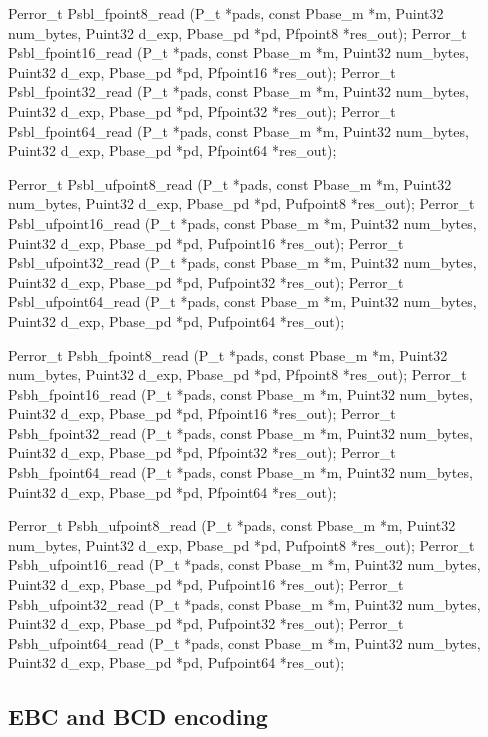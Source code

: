 \begin{tinycodeaux}{\leftmargin=0in}
\codeallowbreaks
Perror_t Psbl_fpoint8_read    (P_t *pads, const Pbase_m *m, Puint32 num_bytes, Puint32 d_exp,
			       Pbase_pd *pd, Pfpoint8 *res_out);
Perror_t Psbl_fpoint16_read   (P_t *pads, const Pbase_m *m, Puint32 num_bytes, Puint32 d_exp,
			       Pbase_pd *pd, Pfpoint16 *res_out);
Perror_t Psbl_fpoint32_read   (P_t *pads, const Pbase_m *m, Puint32 num_bytes, Puint32 d_exp,
			       Pbase_pd *pd, Pfpoint32 *res_out);
Perror_t Psbl_fpoint64_read   (P_t *pads, const Pbase_m *m, Puint32 num_bytes, Puint32 d_exp,
			       Pbase_pd *pd, Pfpoint64 *res_out);

Perror_t Psbl_ufpoint8_read   (P_t *pads, const Pbase_m *m, Puint32 num_bytes, Puint32 d_exp,
			       Pbase_pd *pd, Pufpoint8 *res_out);
Perror_t Psbl_ufpoint16_read  (P_t *pads, const Pbase_m *m, Puint32 num_bytes, Puint32 d_exp,
			       Pbase_pd *pd, Pufpoint16 *res_out);
Perror_t Psbl_ufpoint32_read  (P_t *pads, const Pbase_m *m, Puint32 num_bytes, Puint32 d_exp,
			       Pbase_pd *pd, Pufpoint32 *res_out);
Perror_t Psbl_ufpoint64_read  (P_t *pads, const Pbase_m *m, Puint32 num_bytes, Puint32 d_exp,
			       Pbase_pd *pd, Pufpoint64 *res_out);

Perror_t Psbh_fpoint8_read    (P_t *pads, const Pbase_m *m, Puint32 num_bytes, Puint32 d_exp,
			       Pbase_pd *pd, Pfpoint8 *res_out);
Perror_t Psbh_fpoint16_read   (P_t *pads, const Pbase_m *m, Puint32 num_bytes, Puint32 d_exp,
			       Pbase_pd *pd, Pfpoint16 *res_out);
Perror_t Psbh_fpoint32_read   (P_t *pads, const Pbase_m *m, Puint32 num_bytes, Puint32 d_exp,
			       Pbase_pd *pd, Pfpoint32 *res_out);
Perror_t Psbh_fpoint64_read   (P_t *pads, const Pbase_m *m, Puint32 num_bytes, Puint32 d_exp,
			       Pbase_pd *pd, Pfpoint64 *res_out);

Perror_t Psbh_ufpoint8_read   (P_t *pads, const Pbase_m *m, Puint32 num_bytes, Puint32 d_exp,
			       Pbase_pd *pd, Pufpoint8 *res_out);
Perror_t Psbh_ufpoint16_read  (P_t *pads, const Pbase_m *m, Puint32 num_bytes, Puint32 d_exp,
			       Pbase_pd *pd, Pufpoint16 *res_out);
Perror_t Psbh_ufpoint32_read  (P_t *pads, const Pbase_m *m, Puint32 num_bytes, Puint32 d_exp,
			       Pbase_pd *pd, Pufpoint32 *res_out);
Perror_t Psbh_ufpoint64_read  (P_t *pads, const Pbase_m *m, Puint32 num_bytes, Puint32 d_exp,
			       Pbase_pd *pd, Pufpoint64 *res_out);
\end{tinycodeaux}

\subsection{EBC and BCD encoding}

